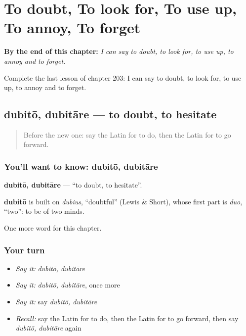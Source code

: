 
\chapter{To doubt, To look for, To use up, To annoy, To forget}
\label{ch:la-to-doubt-to-look-for-to-use-up-to-annoy-to-forget}

\begin{chapteropening}
\textbf{By the end of this chapter:} \emph{I can say to doubt, to look for, to use up, to annoy and to forget.}

Complete the last lesson of chapter 203: I can say to doubt, to look for, to use up, to annoy and to forget.
\end{chapteropening}

\section[dubitō, dubitāre]{dubitō, dubitāre — to doubt, to hesitate}

\label{lesson:LA-C203-dubito}



\begin{quote}
Before the new one: say the Latin for to do, then the Latin for to go forward.
\end{quote}

\subsection*{You'll want to know: dubitō, dubitāre}
\textbf{dubitō, dubitāre} — \textquotedblleft{}to doubt, to hesitate\textquotedblright{}.

\begin{cousinweb}
\textbf{dubitō} is built on \emph{dubius}, \textquotedblleft{}doubtful\textquotedblright{} (Lewis \& Short), whose first part is \emph{duo}, \textquotedblleft{}two\textquotedblright{}: to be of two minds.
\end{cousinweb}

\begin{grammarlens}[title={What you've built}]
One more word for this chapter.
\end{grammarlens}

\subsection*{Your turn}
\begin{itemize}
\raggedright
  \item \emph{Say it:} \emph{dubitō, dubitāre}
  \item \emph{Say it:} \emph{dubitō, dubitāre}, once more
  \item \emph{Say it:} say \emph{dubitō, dubitāre}
  \item \emph{Recall:} say the Latin for to do, then the Latin for to go forward, then say \emph{dubitō, dubitāre} again
\end{itemize}


